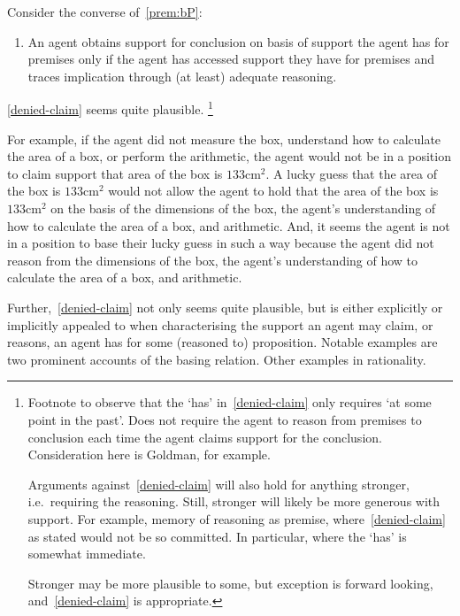\begin{note}[Focus]
  Consider the converse of~\ref{prem:bP}:

  \begin{enumerate}[label=\mp{}, ref=\mp{}]
  \item\label{denied-claim} An agent obtains support for conclusion on basis of support the agent has for premises only if the agent has accessed support they have for premises and traces implication through (at least) adequate reasoning.
  \end{enumerate}

  \ref{denied-claim} seems quite plausible.\nolinebreak
  \footnote{
    Footnote to observe that the `has' in~\ref{denied-claim} only requires `at some point in the past'.
    Does not require the agent to reason from premises to conclusion each time the agent claims support for the conclusion.
      Consideration here is Goldman, for example.

      Arguments against~\ref{denied-claim} will also hold for anything stronger, i.e.\ requiring the reasoning.
      Still, stronger will likely be more generous with support.
      For example, memory of reasoning as premise, where~\ref{denied-claim} as stated would not be so committed.
      In particular, where the `has' is somewhat immediate.

      Stronger may be more plausible to some, but exception is forward looking, and~\ref{denied-claim} is appropriate.
    }

  For example, if the agent did not measure the box, understand how to calculate the area of a box, or perform the arithmetic, the agent would not be in a position to claim support that area of the box is \(133\text{cm}^{2}\).
  A lucky guess that the area of the box is \(133\text{cm}^{2}\) would not allow the agent to hold that the area of the box is  \(133\text{cm}^{2}\) on the basis of the dimensions of the box, the agent's understanding of how to calculate the area of a box, and arithmetic.
  And, it seems the agent is not in a position to base their lucky guess in such a way because the agent did not reason from the dimensions of the box, the agent's understanding of how to calculate the area of a box, and arithmetic.

  Further,~\ref{denied-claim} not only seems quite plausible, but is either explicitly or implicitly appealed to when characterising the support an agent may claim, or reasons, an agent has for some (reasoned to) proposition.
  {\color{red}
    Notable examples are two prominent accounts of the basing relation.
    Other examples in rationality.
  }
\end{note}

